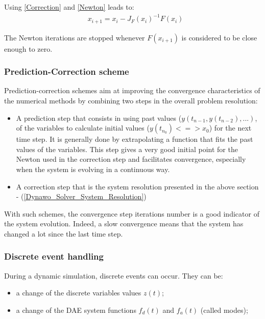 \documentclass[a4paper, 12pt]{report}
\begin{document}
Using \eqref{Correction} and \eqref{Newton} leads to:
\begin{equation}
\begin{aligned}
& x_{i+1} = x_i - J_F(x_i)^{-1} F(x_i)
\end{aligned}
\label{Linear}
\end{equation}

The Newton iterations are stopped whenever $F(x_{i+1})$ is considered to be close enough to zero.

\subsubsection{Prediction-Correction scheme}

Prediction-correction schemes aim at improving the convergence characteristics of the numerical methods by combining two steps in the overall problem resolution:
\begin{itemize}
\item A prediction step that consists in using past values ($y(t_{n-1}, y(t_{n-2}), ...)$,  of the variables to calculate initial values ($y(t_{n_0}) <=> x_0$) for the next time step. It is generally done by extrapolating a function that fits the past values of the variables. This step gives a very good initial point for the Newton used in the correction step and facilitates convergence, especially when the system is evolving in a continuous way.
\item A correction step that is the system resolution presented in the above section - (\ref{Dynawo_Solver_System_Resolution})
\end{itemize}

With such schemes, the convergence step iterations number is a good indicator of the system evolution. Indeed, a slow convergence means that the system has changed a lot since the last time step.

\subsubsection{Discrete event handling}

During a dynamic simulation, discrete events can occur. They can be:
\begin{itemize}
\item a change of the discrete variables values $z(t)$;
\item a change of the \ac{DAE} system functions $f_d(t)$ and $f_a(t)$ (called modes);
\end{itemize}
\end{document}
